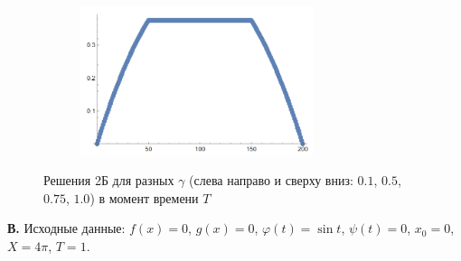 \documentclass[12pt, a4paper]{article}
\begin{document}
\begin{figure}[H]
\begin{subfigure}{.5\textwidth}
			\centering
			\includegraphics[width=0.75\textwidth]{test2-1}
		\end{subfigure}
		\caption{Решения 2Б для разных $\gamma$ (слева направо и сверху вниз: $0.1$, $0.5$, $0.75$, $1.0$) в момент времени $T$}
	\end{figure}
	
		\textbf{В.}  Исходные данные: $f(x)=0$, $g(x)=0$, $\varphi(t)=\sin t$, $\psi(t)=0$, $x_0=0$, $X=4\pi$, $T= 1$. 
	
\end{document}
